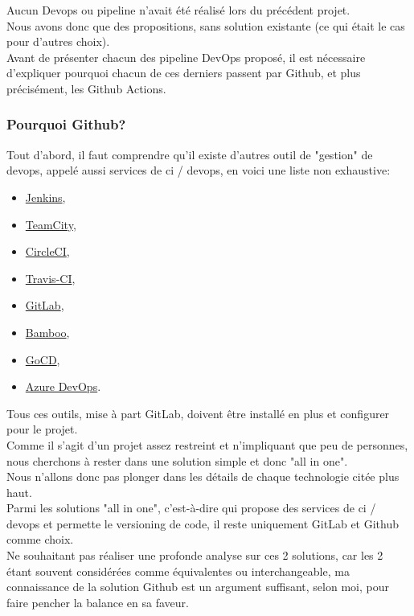 \documentclass[
    iai, %
    il, %
]{heig-tb}
\begin{document}
Aucun Devops ou pipeline n'avait été réalisé lors du précédent projet.\\
Nous avons donc que des propositions, sans solution existante (ce qui était le cas pour d'autres choix).\\
Avant de présenter chacun des pipeline DevOps proposé, il est nécessaire d'expliquer pourquoi chacun de ces derniers passent par Github, et plus précisément, les Github Actions.

\subsubsection{Pourquoi Github?}
Tout d'abord, il faut comprendre qu'il existe d'autres outil de "gestion" de \Gls{devops}, appelé
aussi services de \Gls{ci} / \Gls{devops}, en voici une liste non exhaustive:
\begin{multicols}{2}
    \begin{itemize}
        \item \href{https://www.jenkins.io/}{Jenkins},
        \item \href{https://www.jetbrains.com/teamcity/}{TeamCity},
        \item \href{https://www.guru99.com/top-20-continuous-integration-tools.html}{CircleCI},
        \item \href{https://www.travis-ci.com/}{Travis-CI},
        \item \href{https://about.gitlab.com/}{GitLab},
        \item \href{https://www.atlassian.com/software/bamboo}{Bamboo},
        \item \href{https://www.gocd.org/}{GoCD},
        \item \href{https://azure.microsoft.com/fr-fr/services/devops/}{Azure DevOps}.
    \end{itemize}
\end{multicols}

Tous ces outils, mise à part GitLab, doivent être installé en plus et configurer pour le projet.\\
Comme il s'agit d'un projet assez restreint et n'impliquant que peu de personnes, nous cherchons à rester dans une solution simple et donc "all in one".\\
Nous n'allons donc pas plonger dans les détails de chaque technologie citée plus haut.\\
Parmi les solutions "all in one", c'est-à-dire qui propose des services de \Gls{ci} / \Gls{devops} et permette le versioning de code, il reste uniquement GitLab et Github comme choix.\\
Ne souhaitant pas réaliser une profonde analyse sur ces 2 solutions, car les 2 étant souvent considérées comme équivalentes ou interchangeable, ma connaissance de la solution Github est un argument suffisant, selon moi, pour faire pencher la balance en sa faveur.
\end{document}
